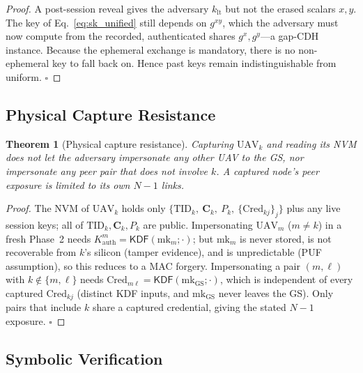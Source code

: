 \documentclass[11pt,a4paper]{article}
\newtheorem{theorem}{Theorem}
\begin{document}
\begin{proof}
A post-session reveal gives the adversary $k_{\text{lt}}$ but not the erased
scalars $x,y$. The key of Eq.~\eqref{eq:sk_unified} still depends on $g^{xy}$,
which the adversary must now compute from the recorded, authenticated shares
$g^{x},g^{y}$---a gap-CDH instance. Because the ephemeral exchange is mandatory,
there is no non-ephemeral key to fall back on. Hence past keys remain
indistinguishable from uniform. \hfill$\square$
\end{proof}

\subsection{Physical Capture Resistance}

\begin{theorem}[Physical capture resistance]
\label{thm:capture}
Capturing $\text{UAV}_k$ and reading its NVM does not let the adversary
impersonate any other UAV to the GS, nor impersonate any peer pair that does not
involve $k$. A captured node's peer exposure is limited to its own $N-1$ links.
\end{theorem}

\begin{proof}
The NVM of $\text{UAV}_k$ holds only $\{\text{TID}_k,\ \bm{C}_k,\ P_k,\ \{\text{Cred}_{kj}\}_j\}$
plus any live session keys; all of $\text{TID}_k,\bm{C}_k,P_k$ are public.
Impersonating $\text{UAV}_m$ ($m\neq k$) in a fresh Phase~2 needs
$K^{m}_{\text{auth}}=\mathsf{KDF}(\text{mk}_m;\cdot)$; but $\text{mk}_m$ is never
stored, is not recoverable from $k$'s silicon (tamper evidence), and is
unpredictable (PUF assumption), so this reduces to a MAC forgery. Impersonating
a pair $(m,\ell)$ with $k\notin\{m,\ell\}$ needs
$\text{Cred}_{m\ell}=\mathsf{KDF}(\text{mk}_{\text{GS}};\cdot)$, which is
independent of every captured $\text{Cred}_{kj}$ (distinct KDF inputs, and
$\text{mk}_{\text{GS}}$ never leaves the GS). Only pairs that include $k$ share a
captured credential, giving the stated $N-1$ exposure. \hfill$\square$
\end{proof}

\subsection{Symbolic Verification}
\label{subsec:symbolic}
\end{document}
